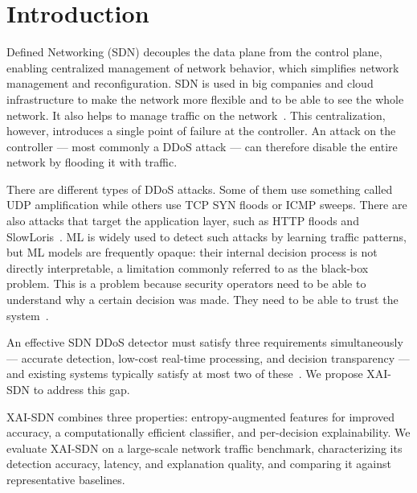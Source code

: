 \documentclass{ieeeaccess}
\begin{document}
\titlepgskip=-21pt

\maketitle

\section{Introduction}
\label{sec:intro}

 Defined Networking (SDN) decouples the data plane from the control plane, enabling centralized management of network behavior, which simplifies network management and reconfiguration. SDN is used in big companies and cloud infrastructure to make the network more flexible and to be able to see the whole network. It also helps to manage traffic on the network~\cite{mckeown2008openflow,kreutz2015sdn}. This centralization, however, introduces a single point of failure at the controller. An attack on the controller --- most commonly a DDoS attack --- can therefore disable the entire network by flooding it with traffic.

There are different types of DDoS attacks. Some of them use something called UDP amplification while others use TCP SYN floods or ICMP sweeps. There are also attacks that target the application layer, such as HTTP floods and SlowLoris~\cite{mirkovic2004taxonomy,sharafaldin2019ddos,bhuyan2014network}. ML is widely used to detect such attacks by learning traffic patterns, but ML models are frequently opaque: their internal decision process is not directly interpretable, a limitation commonly referred to as the black-box problem. This is a problem because security operators need to be able to understand why a certain decision was made. They need to be able to trust the system~\cite{arrieta2020xai,guidotti2018survey,warnecke2020evaluating}.

An effective SDN DDoS detector must satisfy three requirements simultaneously --- accurate detection, low-cost real-time processing, and decision transparency --- and existing systems typically satisfy at most two of these~\cite{mousavi2015early}. We propose XAI-SDN to address this gap.

XAI-SDN combines three properties: entropy-augmented features for improved accuracy, a computationally efficient classifier, and per-decision explainability. We evaluate XAI-SDN on a large-scale network traffic benchmark, characterizing its detection accuracy, latency, and explanation quality, and comparing it against representative baselines.
\end{document}
